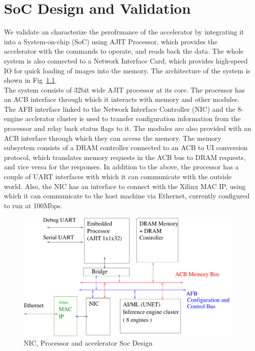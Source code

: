 \documentclass[a4paper,11pt, final]{report}
\begin{document}

\chapter{SoC Design and Validation}
We validate an characterize the perofrmance of the accelerator by integrating it into a System-on-chip (SoC) using AJIT Processor, which provides the accelerator with the commands to operate, and reads back the data. The whole system is also connected to a Network Interface Card, which provides high-speed IO for quick loading of images into the memory. The architecture of the system is shown in Fig~\ref{fig:SoC}.
\\

The system consists of 32bit wide AJIT processor at its core. The processor has an ACB interface through which it interacts with memory and other modules. The AFB interface linked to the Network Interface Controller (NIC) and the 8-engine acclerator cluster is used to transfer configuration information from the processor and relay back status flags to it. The modules are also provided with an ACB interface through which they can access the memory. The memory subsystem consists of a DRAM controller connected to an ACB to UI conversion protocol, which translates memory requests in the ACB bus to DRAM requests, and vice versa for the responses. In addition to the above, the processor has a couple of UART interfaces with which it can communicate with the outside world. Also, the NIC has an interface to connect with the Xilinx MAC IP, using which it can communicate to the host machine via Ethernet, currently configured to run at 100Mbps. 
\\
		\begin{figure}[h]
			\centering
			\includegraphics[width=12cm]{./figures/BlockDiagram.pdf}
			\caption{NIC, Processor and accelerator Soc Design}
			\label{fig:SoC}
		\end{figure}
\end{document}

